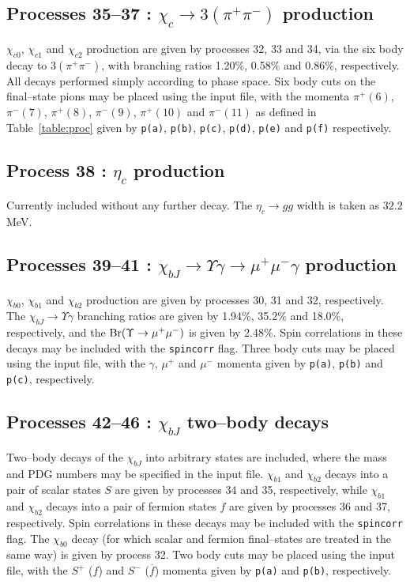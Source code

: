 \documentclass[12pt]{article}
\begin{document}
\subsection{Processes 35--37 : $\chi_c \to 3(\pi^+\pi^-)$ production}

$\chi_{c0}$, $\chi_{c1}$ and $\chi_{c2}$ production are given by processes 32, 33 and 34,  via the six body decay to $3(\pi^+\pi^-)$, with branching ratios 1.20\%, 0.58\% and 0.86\%, respectively. All decays performed simply according to phase space. Six body cuts on the final--state pions may be placed using the input file, with the momenta $\pi^+(6)$,  $\pi^-(7)$, $\pi^+(8)$, $\pi^-(9)$, $\pi^+(10)$ and $\pi^-(11)$ as defined in Table~\ref{table:proc} given by \texttt{p(a)}, \texttt{p(b)}, \texttt{p(c)}, \texttt{p(d)}, \texttt{p(e)} and \texttt{p(f)} respectively.

\subsection{Process 38 : $\eta_c$ production}

Currently included without any further decay. The $\eta_c \to gg$ width is taken as $32.2$ MeV.

\subsection{Processes 39--41 : $\chi_{bJ}\to \Upsilon\gamma\to \mu^+\mu^-\gamma$ production}

$\chi_{b0}$, $\chi_{b1}$ and $\chi_{b2}$ production are given by processes 30, 31 and 32, respectively. The $\chi_{bJ}\to \Upsilon \gamma$ branching ratios are given by 1.94\%, 35.2\% and 18.0\%, respectively, and the ${\rm Br}(\Upsilon\to\mu^+\mu^-)$ is given by 2.48\%. Spin correlations in these decays may be included with the \texttt{spincorr} flag. Three body cuts may be placed using the input file, with the $\gamma$, $\mu^+$ and $\mu^-$ momenta given by \texttt{p(a)}, \texttt{p(b)} and \texttt{p(c)}, respectively.

\subsection{Processes 42--46 : $\chi_{bJ}$ two--body decays}

Two--body decays of the $\chi_{bJ}$ into arbitrary states are included, where the mass and PDG numbers may be specified in the input file. $\chi_{b1}$ and $\chi_{b2}$ decays into a pair of scalar states $S$ are given by processes 34 and 35, respectively, while $\chi_{b1}$ and $\chi_{b2}$ decays into a pair of fermion states $f$ are given by processes 36 and 37, respectively. Spin correlations in these decays may be included with the \texttt{spincorr} flag.  The $\chi_{b0}$ decay (for which scalar and fermion final--states are treated in the same way) is given by process 32. Two body cuts may be placed using the input file, with the $S^+$ ($f$) and $S^-$ ($\overline{f}$) momenta given by \texttt{p(a)} and \texttt{p(b)}, respectively.
\end{document}
